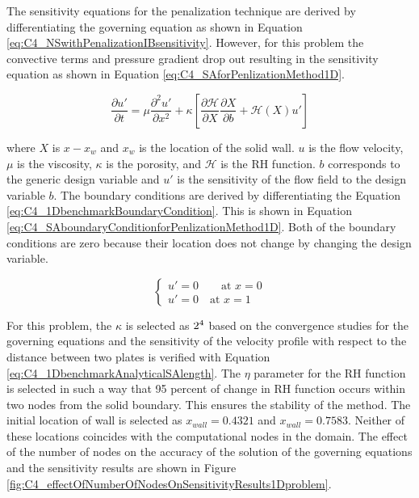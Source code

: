 The sensitivity equations for the penalization technique are derived by differentiating the governing equation as shown in Equation \eqref{eq:C4_NSwithPenalizationIBsensitivity}. However, for this problem the convective terms and pressure gradient drop out resulting in the sensitivity equation as shown in Equation \eqref{eq:C4_SAforPenlizationMethod1D}.

\begin{equation}\label{eq:C4_SAforPenlizationMethod1D}
    \frac{\partial u'}{\partial t} = 
    \mu \frac{\partial^2 u'}{\partial x^2} +
    \kappa \left[
    \frac{\partial \mathcal{H}}{\partial X} \frac{\partial X}{\partial b} + 
    \mathcal{H}(X) u'
    \right]
\end{equation}

where $X$ is $x - x_w$ and $x_w$ is the location of the solid wall. $u$ is the flow velocity, $\mu$ is the viscosity, $\kappa$ is the porosity, and $\mathcal{H}$ is the RH function. $b$ corresponds to the generic design variable and $u'$ is the sensitivity of the flow field to the design variable $b$. The boundary conditions are derived by differentiating the Equation \eqref{eq:C4_1DbenchmarkBoundaryCondition}. This is shown in Equation \eqref{eq:C4_SAboundaryConditionforPenlizationMethod1D}. Both of the boundary conditions are zero because their location does not change by changing the design variable.

\begin{equation}\label{eq:C4_SAboundaryConditionforPenlizationMethod1D}
\begin{cases}
    u' = 0 \qquad \text{at } x = 0 \\
    u' = 0 \quad \text{at } x = 1
\end{cases}
\end{equation}

For this problem, the $\kappa$ is selected as $2 \time 10^4$ based on the convergence studies for the governing equations and the sensitivity of the velocity profile with respect to the distance between two plates is verified with Equation \eqref{eq:C4_1DbenchmarkAnalyticalSAlength}. The $\eta$ parameter for the RH function is selected in such a way that 95 percent of change in RH function occurs within two nodes from the solid boundary. This ensures the stability of the method. The initial location of wall is selected as $x_{wall} = 0.4321$ and $x_{wall} = 0.7583$. Neither of these locations coincides with the computational nodes in the domain. The effect of the number of nodes on the accuracy of the solution of the governing equations and the sensitivity results are shown in Figure \ref{fig:C4_effectOfNumberOfNodesOnSensitivityResults1Dproblem}.

